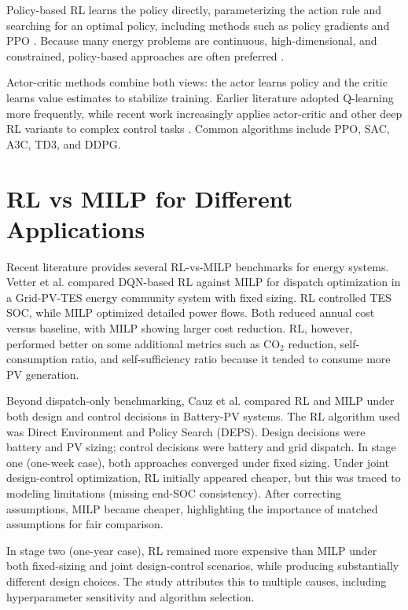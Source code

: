 Policy-based RL learns the policy directly, parameterizing the action rule and searching for an optimal policy, including methods such as policy gradients and PPO \cite{gao2025policyGradientMethods}. Because many energy problems are continuous, high-dimensional, and constrained, policy-based approaches are often preferred \cite{cao2020rlApplicationsPowerEnergy}.

Actor-critic methods combine both views: the actor learns policy and the critic learns value estimates to stabilize training. Earlier literature adopted Q-learning more frequently, while recent work increasingly applies actor-critic and other deep RL variants to complex control tasks \cite{shengren2022performanceComparison}. Common algorithms include PPO, SAC, A3C, TD3, and DDPG.

\section{RL vs MILP for Different Applications}

Recent literature provides several RL-vs-MILP benchmarks for energy systems. Vetter et al. \cite{vetter2025deepReinforcementMILP} compared DQN-based RL against MILP for dispatch optimization in a Grid-PV-TES energy community system with fixed sizing. RL controlled TES SOC, while MILP optimized detailed power flows. Both reduced annual cost versus baseline, with MILP showing larger cost reduction. RL, however, performed better on some additional metrics such as CO$_2$ reduction, self-consumption ratio, and self-sufficiency ratio because it tended to consume more PV generation.

Beyond dispatch-only benchmarking, Cauz et al. \cite{cauz2023reinforcementJointDesign} compared RL and MILP under both design and control decisions in Battery-PV systems. The RL algorithm used was Direct Environment and Policy Search (DEPS). Design decisions were battery and PV sizing; control decisions were battery and grid dispatch. In stage one (one-week case), both approaches converged under fixed sizing. Under joint design-control optimization, RL initially appeared cheaper, but this was traced to modeling limitations (missing end-SOC consistency). After correcting assumptions, MILP became cheaper, highlighting the importance of matched assumptions for fair comparison.

In stage two (one-year case), RL remained more expensive than MILP under both fixed-sizing and joint design-control scenarios, while producing substantially different design choices. The study attributes this to multiple causes, including hyperparameter sensitivity and algorithm selection.

